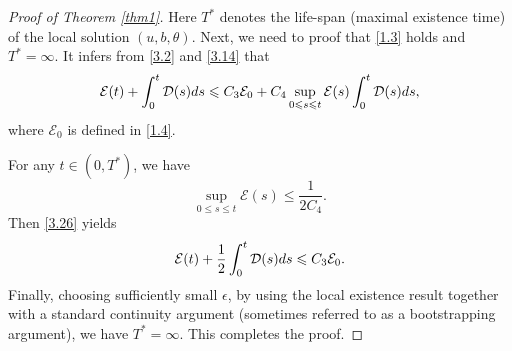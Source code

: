 \documentclass[10pt,a4paper]{amsart}
\numberwithin{equation}{section}
\begin{document}
\begin{proof}[Proof of Theorem \ref{thm1}]
Here $T^*$ denotes the life-span (maximal existence time) of the local solution 
$(u,b,\theta)$. Next, we need to proof that \eqref{1.3} holds and $T^*=\infty$. 
It infers from \eqref{3.2} and \eqref{3.14} that
\begin{equation}\label{3.26}
 \mathcal{E}(t)+\int_0^t\mathcal{D}(s){\rm d}s\leqslant C_3\mathcal{E}_0+C_4\sup _{0\leqslant s\leqslant t}\mathcal{E}(s)\int_0^t\mathcal{D}(s){\rm d}s,
\end{equation}
where $\mathcal{E}_0$ is defined in \eqref{1.4}.

For any $t\in(0,T^*)$, we have 
\[
 \sup_{0\leqslant s\leqslant t}\mathcal{E}(s)\leqslant\frac{1}{2C_4}.
\]
Then \eqref{3.26} yields
\begin{equation}\label{3.27}
 \mathcal{E}(t)+\frac{1}{2}\int_0^t\mathcal{D}(s){\rm d}s\leqslant C_3\mathcal{E}_0.
\end{equation}
Finally, choosing sufficiently small $\epsilon$, by using the local existence result 
together with a standard continuity argument (sometimes referred to as a bootstrapping 
argument), we have $T^*=\infty$.
This completes the proof. 
\end{proof}
\end{document}
